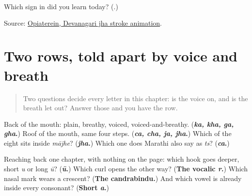 \begin{tcolorbox}[breakable,colback=teal!4,colframe=teal!35!black,title={Before you move on}]
Which sign in \textbf{} did you learn today? (\textbf{}.)

Source: \href{https://commons.wikimedia.org/wiki/File:Deva-\%E0\%A4\%9D-order.gif}{Opiaterein, Devanagari jha stroke animation}.
\end{tcolorbox}
\section[two rows (don olī)]{Two rows, told apart by voice and breath}

\label{lesson:MR-R06-two-rows-recall}



\begin{quote}
Two questions decide every letter in this chapter: is the voice on, and is the breath let out? Answer those and you have the row.
\end{quote}

\begin{tcolorbox}[breakable,colback=teal!4,colframe=teal!35!black,title={Before you move on}]
Back of the mouth: plain, breathy, voiced, voiced-and-breathy. (\textbf{\emph{ka, kha, ga, gha}.}) Roof of the mouth, same four steps. (\textbf{\emph{ca, cha, ja, jha}.}) Which of the eight sits inside \emph{mājhe}? (\textbf{\emph{jha}.}) Which one does Marathi also say as \emph{ts}? (\textbf{\emph{ca}.})

Reaching back one chapter, with nothing on the page: which hook goes deeper, short \emph{u} or long \emph{ū}? (\textbf{\emph{ū}.}) Which curl opens the other way? (\textbf{The vocalic \emph{r}.}) Which nasal mark wears a crescent? (\textbf{The candrabindu.}) And which vowel is already inside every consonant? (\textbf{Short \emph{a}.})
\end{tcolorbox}
